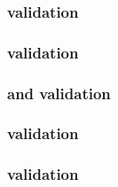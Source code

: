 \begin{sbmlenum}
\end{sbmlenum} \subsubsection*{ validation} \begin{sbmlenum}




\end{sbmlenum} \subsubsection*{ validation} \begin{sbmlenum}


\end{sbmlenum} \subsubsection*{ and  validation} \begin{sbmlenum}


\end{sbmlenum} \subsubsection*{ validation} \begin{sbmlenum}


\end{sbmlenum} \subsubsection*{ validation} \begin{sbmlenum}


\end{sbmlenum}
